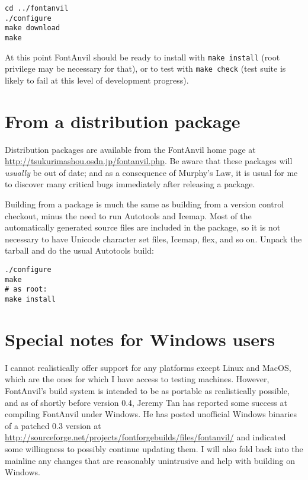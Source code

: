 \begin{verbatim}
cd ../fontanvil
./configure
make download
make
\end{verbatim}

At this point FontAnvil should be ready to install with \texttt{make
install} (root privilege may be necessary for that), or to test with
\texttt{make check} (test suite is likely to fail at this level of
development progress).

\section{From a distribution package}

Distribution packages are available from the FontAnvil home page at
\url{http://tsukurimashou.osdn.jp/fontanvil.php}.  Be aware that these
packages will \emph{usually} be out of date; and as a consequence of
Murphy's Law, it is usual for me to discover many critical bugs immediately
after releasing a package.

Building from a package is much the same as building from a version
control checkout, minus the need to run Autotools and Icemap.  Most of the
automatically generated source files are included in the package, so it is
not necessary to have Unicode character set files, Icemap, flex, and so on.
Unpack the tarball and do the usual Autotools build:

\begin{verbatim}
./configure
make
# as root:
make install
\end{verbatim}

\section{Special notes for Windows users}

I cannot realistically offer support for any platforms except Linux and
MacOS, which are the ones for which I have access to testing machines. 
However, FontAnvil's build system is intended to be as portable as
realistically possible, and as of shortly before version 0.4, Jeremy Tan has
reported some success at compiling FontAnvil under Windows.  He has posted
unofficial Windows binaries of a patched 0.3 version at
\url{http://sourceforge.net/projects/fontforgebuilds/files/fontanvil/} and
indicated some willingness to possibly continue updating them.  I will also
fold back into the mainline any changes that are reasonably unintrusive and
help with building on Windows.

